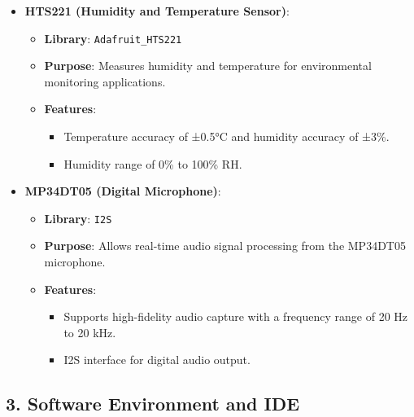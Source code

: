 \begin{itemize}
		\item \textbf{HTS221 (Humidity and Temperature Sensor)}:
		\begin{itemize}
			\item \textbf{Library}: \texttt{Adafruit\_HTS221}
			\item \textbf{Purpose}: Measures humidity and temperature for environmental monitoring applications.
			\item \textbf{Features}:
			\begin{itemize}
				\item Temperature accuracy of ±0.5°C and humidity accuracy of ±3\%.
				\item Humidity range of 0\% to 100\% RH.
			\end{itemize}
		\end{itemize}
		
		\item \textbf{MP34DT05 (Digital Microphone)}:
		\begin{itemize}
			\item \textbf{Library}: \texttt{I2S}
			\item \textbf{Purpose}: Allows real-time audio signal processing from the MP34DT05 microphone.
			\item \textbf{Features}:
			\begin{itemize}
				\item Supports high-fidelity audio capture with a frequency range of 20 Hz to 20 kHz.
				\item I2S interface for digital audio output.
			\end{itemize}
		\end{itemize}
	\end{itemize}
	
	\subsection*{3. Software Environment and IDE}
	
